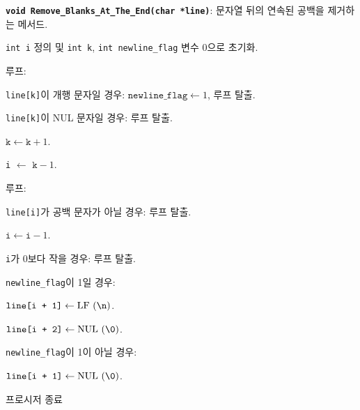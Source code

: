 \documentclass[runningheads]{../../../llncs}
\begin{document}
\textbf{\texttt{void Remove_Blanks_At_The_End(char *line)}}: 문자열 뒤의 연속된 공백을 제거하는 메서드.
\begin{algorithm}
	\item \texttt{int i} 정의 및 \texttt{int k}, \texttt{int newline_flag} 변수 0으로 초기화.	
	\item 루프:
			\begin{algorithm}
				\item \texttt{line[k]}이 개행 문자일 경우: $\texttt{newline_flag} \leftarrow 1$, 루프 탈출.
				\item \texttt{line[k]}이 NUL 문자일 경우: 루프 탈출.
				\item $\texttt{k} \leftarrow \texttt{k} + 1$.
			\end{algorithm} 
	\item \texttt{i} $\leftarrow$ $\texttt{k} - 1$.
	\item 루프:
			\begin{algorithm}
				\item \texttt{line[i]}가 공백 문자가 아닐 경우: 루프 탈출.
				\item $\texttt{i} \leftarrow \texttt{i} - 1$.
				\item \texttt{i}가 0보다 작을 경우: 루프 탈출.
			\end{algorithm}
	\item \texttt{newline_flag}이 1일 경우:
			\begin{algorithm}
				\item $\texttt{line[i + 1]} \leftarrow \textrm{LF (\texttt{\textbackslash{}n})}$.
				\item $\texttt{line[i + 2]} \leftarrow \textrm{NUL (\texttt{\textbackslash{}0})}$.
			\end{algorithm}
	\item \texttt{newline_flag}이 1이 아닐 경우:
			\begin{algorithm}
				\item $\texttt{line[i + 1]} \leftarrow \textrm{NUL (\texttt{\textbackslash{}0})}$.
			\end{algorithm}
	\item 프로시저 종료
\end{algorithm}
\end{document}
